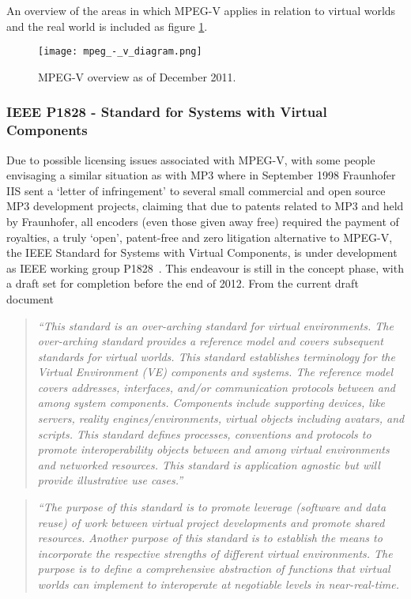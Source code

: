 An overview of the areas in which MPEG-V applies in relation to virtual worlds and the real world is included as figure \ref{mpeg_-_v_diagram.png}.

\begin{figure}[h]
\centering
\texttt{[image: mpeg\_-\_v\_diagram.png]}
\caption{MPEG-V overview as of December 2011.}
\label{mpeg_-_v_diagram.png}
\end{figure}


\subsubsection{IEEE P1828 - Standard for Systems with Virtual Components}
Due to possible licensing issues associated with MPEG-V, with some people envisaging a similar situation as with MP3 where in September 1998 Fraunhofer IIS sent a `letter of infringement' to several small commercial and open source MP3 development projects, claiming that due to patents related to MP3 and held by Fraunhofer, all encoders (even those given away free) required the payment of royalties, a truly `open', patent-free and zero litigation alternative to MPEG-V, the IEEE Standard for Systems with Virtual Components, is under development as IEEE working group P1828~\cite{IEEE}. This endeavour is still in the concept phase, with a draft set for completion before the end of 2012. From the current draft document

\begin{quote}
\textit{``This standard is an over-arching standard for virtual environments. The over-arching standard provides a reference model and covers subsequent standards for virtual worlds. This standard establishes terminology for the Virtual Environment (VE) components and systems. The reference model covers addresses, interfaces, and/or communication protocols between and among system components. Components include supporting devices, like servers, reality engines/environments, virtual objects including avatars, and scripts. This standard defines processes, conventions and protocols to promote interoperability objects between and among virtual environments and networked resources. This standard is application agnostic but will provide illustrative use cases.''}
\end{quote}

\begin{quote}
\textit{``The purpose of this standard is to promote leverage (software and data reuse) of work between virtual project developments and promote shared resources. Another purpose of this standard is to establish the means to incorporate the respective strengths of different virtual environments. The purpose is to define a comprehensive abstraction of functions that virtual worlds can implement to interoperate at negotiable levels in near-real-time.}~\cite{InstituteofElectricalandElectronicsEngineers2012}
\end{quote}

